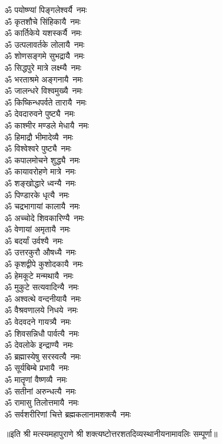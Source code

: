 \begin{multicols}{2}
\begin{flushleft}
ॐ पयोष्ण्यां पिङ्गलेश्वर्यै~नमः\\
ॐ कृतशौचे सिंहिकायै~नमः\\
ॐ कार्तिकेये यशस्कर्यै~नमः\\
ॐ उत्पलावर्तके लोलायै~नमः\\
ॐ शोणसङ्गमे सुभद्रायै~नमः\\
ॐ सिद्धपुरे मात्रे लक्ष्म्यै~नमः\\
ॐ भरताश्रमे अङ्गनायै~नमः\\
ॐ जालन्धरे विश्वमुख्यै~नमः\hfill{}\\
ॐ किष्किन्धपर्वते तारायै~नमः\\
ॐ देवदारुवने पुष्ट्यै~नमः\\
ॐ काश्मीर मण्डले मेधायै~नमः\\
ॐ हिमाद्रौ भीमादेव्यै~नमः\\
ॐ विश्वेश्वरे पुष्ट्यै~नमः\\
ॐ कपालमोचने शुद्ध्यै~नमः\\
ॐ कायावरोहणे मात्रे~नमः\\
ॐ शङ्खोद्धारे ध्वन्यै~नमः\\
ॐ पिण्डारके धृत्यै~नमः\\
ॐ चद्रभागायां कालायै~नमः\hfill{}\\
ॐ अच्चोदे शिवकारिण्यै~नमः\\
ॐ वेणायां अमृतायै~नमः\\
ॐ बदर्यां उर्वश्यै~नमः\\
ॐ उत्तरकुरौ औषध्यै~नमः\\
ॐ कृशद्वीपे कुशोदकायै~नमः\\
ॐ हेमकूटे मन्मथायै~नमः\\
ॐ मुकुटे सत्यवादिन्यै~नमः\\
ॐ अश्वत्थे वन्दनीयायै~नमः\\
ॐ वैश्रवणालये निधये~नमः\\
ॐ वेदवदने गायत्र्यै~नमः\hfill{}\\
ॐ शिवसन्निधौ पार्वत्यै~नमः\\
ॐ देवलोके इन्द्राण्यै~नमः\\
ॐ ब्रह्मास्येषु सरस्वत्यै~नमः\\
ॐ सूर्यबिम्बे प्रभायै~नमः\\
ॐ मातॄणां वैष्णव्यै~नमः\\
ॐ सतीनां अरुन्धत्यै~नमः\\
ॐ रामासु तिलोत्तमायै~नमः\\
ॐ सर्वशरीरिणां चित्ते ब्रह्मकलानामशक्त्यै~नमः\\
\end{flushleft}
\end{multicols}
॥इति श्री मत्स्यमहापुराणे श्री शक्त्यष्टोत्तर\-शतदिव्यस्थानीयनामावलिः सम्पूर्णा॥
